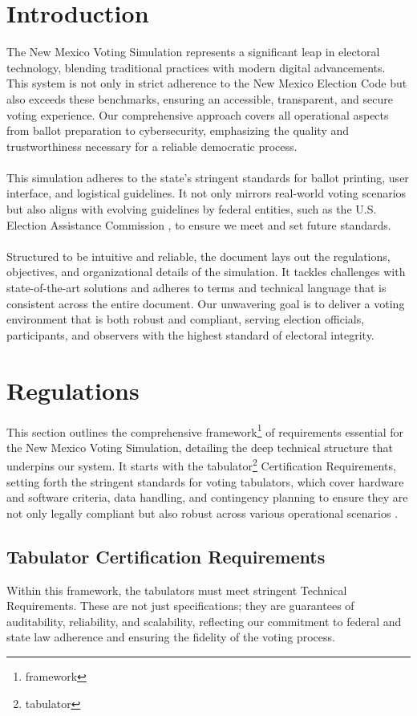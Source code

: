 \documentclass{article}
\begin{document}
\section{Introduction}
The New Mexico Voting Simulation represents a significant leap in electoral technology, blending traditional practices with modern digital advancements. This system is not only in strict adherence to the New Mexico Election Code but also exceeds these benchmarks, ensuring an accessible, transparent, and secure voting experience. Our comprehensive approach covers all operational aspects from ballot preparation to cybersecurity, emphasizing the quality and trustworthiness necessary for a reliable democratic process. \\ \\
This simulation adheres to the state's stringent standards for ballot printing, user interface, and logistical guidelines. It not only mirrors real-world voting scenarios but also aligns with evolving guidelines by federal entities, such as the U.S. Election Assistance Commission \cite{eacVotingAccessibility}, to ensure we meet and set future standards. \\ \\
Structured to be intuitive and reliable, the document lays out the regulations, objectives, and organizational details of the simulation. It tackles challenges with state-of-the-art solutions and adheres to terms and technical language that is consistent across the entire document. Our unwavering goal is to deliver a voting environment that is both robust and compliant, serving election officials, participants, and observers with the highest standard of electoral integrity.

\section{Regulations}
This section outlines the comprehensive \gls{framework}\footnote{\glsdesc{framework}} of requirements essential for the New Mexico Voting Simulation, detailing the deep technical structure that underpins our system. It starts with the \Gls{tabulator}\footnote{\glsdesc{tabulator}} Certification Requirements, setting forth the stringent standards for voting tabulators, which cover hardware and software criteria, data handling, and contingency planning to ensure they are not only legally compliant but also robust across various operational scenarios \cite{nmVotingSystem}.

\subsection{Tabulator Certification Requirements}
Within this framework, the tabulators must meet stringent Technical Requirements. These are not just specifications; they are guarantees of auditability, reliability, and scalability, reflecting our commitment to federal and state law adherence and ensuring the fidelity of the voting process.
\end{document}
